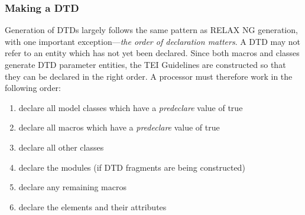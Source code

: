 \subsubsection[{Making a DTD}]{Making a DTD}\label{IM-makeDTD}\par
Generation of DTDs largely follows the same pattern as RELAX NG generation, with one important exception—{\itshape the order of declaration matters}. A DTD may not refer to an entity which has not yet been declared. Since both macros and classes generate DTD parameter entities, the TEI Guidelines are constructed so that they can be declared in the right order. A processor must therefore work in the following order: \begin{enumerate}
\item declare all model classes which have a {\itshape predeclare} value of true
\item declare all macros which have a {\itshape predeclare} value of true
\item declare all other classes
\item declare the modules (if DTD fragments are being constructed)
\item declare any remaining macros
\item declare the elements and their attributes
\end{enumerate} \par
